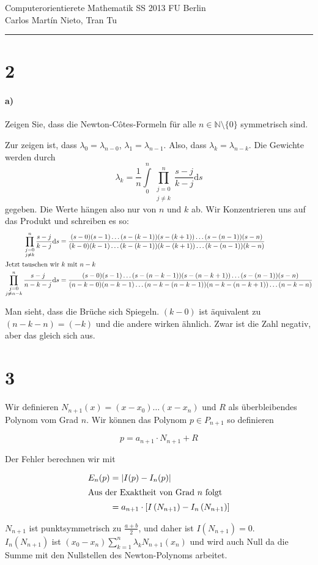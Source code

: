 \documentclass[ngerman,a4paper]{scrartcl}
\newcommand{\N}{\ensuremath{\mathbb{N}}}
\begin{document}
{\sffamily
  \hfill
  Computerorientierete Mathematik SS 2013\hfill
  FU Berlin\\[8pt]
  \hfill Carlos Martín Nieto, Tran Tu\hrule \bigskip
}

\section*{2}

\paragraph{a)}

Zeigen Sie, dass die Newton-Côtes-Formeln für alle
$n\in\N\setminus\{0\}$ symmetrisch sind.

Zur zeigen ist, dass $\lambda_0 = \lambda_{n-0}$, $\lambda_1 =
\lambda_{n-1}$. Also, dass $\lambda_k = \lambda_{n-k}$. Die Gewichte
werden durch
\[
\lambda_k = \frac{1}{n} \int\limits^n_0\prod^n_{\substack{j=0\\j\neq k}} \frac{s-j}{k-j}\text{d}s
\]
gegeben. Die Werte hängen also nur von $n$ und $k$ ab. Wir
Konzentrieren uns auf das Produkt und schreiben es so:
\begin{align*}
  \prod^n_{\substack{j=0\\j\neq k}} \frac{s-j}{k-j}\text{d}s &= \frac{(s-0)(s-1)\dots(s-(k-1))(s-(k+1))\dots(s-(n-1))(s-n)}
  {(k-0)(k-1)\dots(k-(k-1))(k-(k+1))\dots(k-(n-1))(k-n)}\\
  \intertext{Jetzt tauschen wir $k$ mit $n-k$}
  \prod^n_{\substack{j=0\\j\neq n-k}} \frac{s-j}{n-k-j}\text{d}s &= \frac{(s-0)(s-1)\dots(s-(n-k-1))(s-(n-k+1))\dots(s-(n-1))(s-n)}
  {(n-k-0)(n-k-1)\dots(n-k-(n-k-1))(n-k-(n-k+1))\dots(n-k-n)}
\end{align*}

Man sieht, dass die Brüche sich Spiegeln. $(k-0)$ ist äquivalent zu
$(n-k-n)=(-k)$ und die andere wirken ähnlich. Zwar ist die Zahl
negativ, aber das gleich sich aus.

\section*{3}

Wir definieren $N_{n+1}(x) = (x - x_0)\dots(x-x_n)$ und $R$ als
überbleibendes Polynom vom Grad $n$. Wir können das Polynom $p \in
P_{n+1}$ so definieren

\[
p = a_{n+1} \cdot N_{n+1} + R
\]

Der Fehler berechnen wir mit

\begin{align*}
  E_n(p) &= |I(p) - I_n(p)|\\
  \intertext{Aus der Exaktheit von Grad $n$ folgt}
  &= a_{n+1}\cdot\left[I\left(N_{n+1}\right) -
    I_n\left(N_{n+1}\right)\right]
\end{align*}

$N_{n+1}$ ist punktsymmetrisch zu $\frac{a+b}{2}$, und daher ist
$I(N_{n+1}) = 0$.\\

$I_n(N_{n+1})$ ist $(x_0 - x_n)\sum^n_{k=1} \lambda_k N_{n+1}(x_n)$
und wird auch Null da die Summe mit den Nullstellen des
Newton-Polynoms arbeitet.
\end{document}
